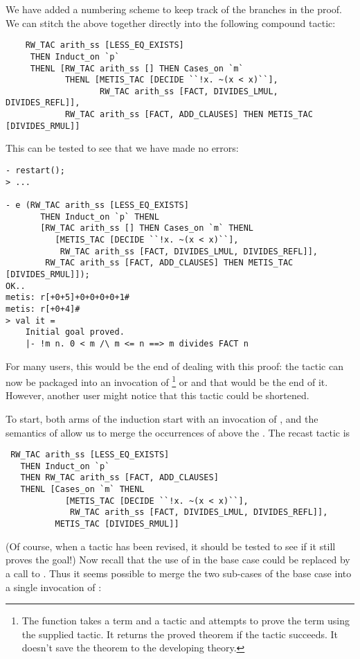 We have added a numbering scheme to keep track of the branches in the
proof. We can stitch the above together directly into the following compound
tactic:

\begin{hol}
\begin{verbatim}
    RW_TAC arith_ss [LESS_EQ_EXISTS]
     THEN Induct_on `p`
     THENL [RW_TAC arith_ss [] THEN Cases_on `m`
            THENL [METIS_TAC [DECIDE ``!x. ~(x < x)``],
                   RW_TAC arith_ss [FACT, DIVIDES_LMUL, DIVIDES_REFL]],
            RW_TAC arith_ss [FACT, ADD_CLAUSES] THEN METIS_TAC [DIVIDES_RMUL]]
\end{verbatim}
\end{hol}

\noindent This can be tested to see that we have made no errors:

\begin{session}
\begin{verbatim}
- restart();
> ...

- e (RW_TAC arith_ss [LESS_EQ_EXISTS]
       THEN Induct_on `p` THENL
       [RW_TAC arith_ss [] THEN Cases_on `m` THENL
          [METIS_TAC [DECIDE ``!x. ~(x < x)``],
           RW_TAC arith_ss [FACT, DIVIDES_LMUL, DIVIDES_REFL]],
        RW_TAC arith_ss [FACT, ADD_CLAUSES] THEN METIS_TAC [DIVIDES_RMUL]]);
OK..
metis: r[+0+5]+0+0+0+0+1#
metis: r[+0+4]#
> val it =
    Initial goal proved.
    |- !m n. 0 < m /\ m <= n ==> m divides FACT n
\end{verbatim}
\end{session}

For many users, this would be the end of dealing with this proof: the
tactic can now be packaged into an invocation of
\footnote{The  function takes a term and a tactic
and attempts to prove the term using the supplied tactic.  It
returns the proved theorem if the tactic succeeds.  It doesn't save
the theorem to the developing theory.} or  and that
would be the end of it. However, another user might notice
that this tactic could be shortened.

To start, both arms of the induction start with an invocation of
, and the semantics of  allow us to merge the
occurrences of  above the . The recast tactic
is
\begin{hol}
\begin{verbatim}
 RW_TAC arith_ss [LESS_EQ_EXISTS]
   THEN Induct_on `p`
   THEN RW_TAC arith_ss [FACT, ADD_CLAUSES]
   THENL [Cases_on `m` THENL
            [METIS_TAC [DECIDE ``!x. ~(x < x)``],
             RW_TAC arith_ss [FACT, DIVIDES_LMUL, DIVIDES_REFL]],
          METIS_TAC [DIVIDES_RMUL]]
\end{verbatim}
\end{hol}
(Of course, when a tactic has been revised, it should be tested to see
if it still proves the goal!) Now recall that the use of 
in the base case could be replaced by a call to . Thus
it seems possible to merge the two sub-cases of the base case into a
single invocation of :

